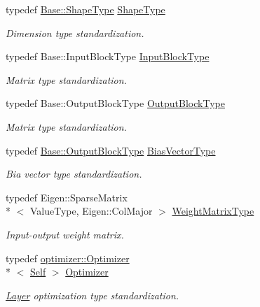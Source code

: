\begin{DoxyCompactItemize}
typedef \hyperlink{classffnn_1_1layer_1_1internal_1_1_interface_a945709b1d0ea54a51539b80d04485f5f}{Base\-::\-Shape\-Type} \hyperlink{classffnn_1_1layer_1_1_sparsely_connected_a3402308adea340327d9305dce67fec60}{Shape\-Type}
\begin{DoxyCompactList}\small\item\em Dimension type standardization. \end{DoxyCompactList}\item 
typedef Base\-::\-Input\-Block\-Type \hyperlink{classffnn_1_1layer_1_1_sparsely_connected_ab405e0e2248096b07511cdc4a64d0126}{Input\-Block\-Type}
\begin{DoxyCompactList}\small\item\em Matrix type standardization. \end{DoxyCompactList}\item 
typedef Base\-::\-Output\-Block\-Type \hyperlink{classffnn_1_1layer_1_1_sparsely_connected_acf74c21ad0bae12c595065447bdc740a}{Output\-Block\-Type}
\begin{DoxyCompactList}\small\item\em Matrix type standardization. \end{DoxyCompactList}\item 
typedef \hyperlink{classffnn_1_1layer_1_1_hidden_a9b9e276188ef490ea5301f553225c735}{Base\-::\-Output\-Block\-Type} \hyperlink{classffnn_1_1layer_1_1_sparsely_connected_a2ff479719bf630de3957b72e9691893b}{Bias\-Vector\-Type}
\begin{DoxyCompactList}\small\item\em Bia vector type standardization. \end{DoxyCompactList}\item 
typedef Eigen\-::\-Sparse\-Matrix\\*
$<$ Value\-Type, Eigen\-::\-Col\-Major $>$ \hyperlink{classffnn_1_1layer_1_1_sparsely_connected_ade8f7fd54c27df9f18e214c4b7ce1e79}{Weight\-Matrix\-Type}
\begin{DoxyCompactList}\small\item\em Input-\/output weight matrix. \end{DoxyCompactList}\item 
typedef \hyperlink{classffnn_1_1optimizer_1_1_optimizer}{optimizer\-::\-Optimizer}\\*
$<$ \hyperlink{classffnn_1_1layer_1_1_layer_a1d461b24632a849b2c26a5051a9cdbeb}{Self} $>$ \hyperlink{classffnn_1_1layer_1_1_sparsely_connected_a6371c852114c9312096816ee73d92175}{Optimizer}
\begin{DoxyCompactList}\small\item\em \hyperlink{classffnn_1_1layer_1_1_layer}{Layer} optimization type standardization. \end{DoxyCompactList}\end{DoxyCompactItemize}
